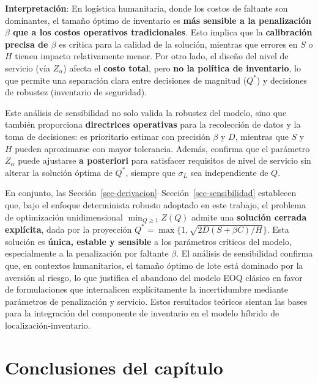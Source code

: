 \documentclass[
  spanish,
  us-letterpaper,
]{scrreprt}
\numberwithin{equation}{section}
\begin{document}
\textbf{Interpretación}: En logística humanitaria, donde los costos de
faltante son dominantes, el tamaño óptimo de inventario es \textbf{más
sensible a la penalización \(\beta\) que a los costos operativos
tradicionales}. Esto implica que la \textbf{calibración precisa de
\(\beta\)} es crítica para la calidad de la solución, mientras que
errores en \(S\) o \(H\) tienen impacto relativamente menor. Por otro
lado, el diseño del nivel de servicio (vía \(Z_\alpha\)) afecta el
\textbf{costo total}, pero \textbf{no la política de inventario}, lo que
permite una separación clara entre decisiones de magnitud (\(Q^*\)) y
decisiones de robustez (inventario de seguridad).

Este análisis de sensibilidad no solo valida la robustez del modelo,
sino que también proporciona \textbf{directrices operativas} para la
recolección de datos y la toma de decisiones: es prioritario estimar con
precisión \(\beta\) y \(D\), mientras que \(S\) y \(H\) pueden
aproximarse con mayor tolerancia. Además, confirma que el parámetro
\(Z_\alpha\) puede ajustarse \textbf{a posteriori} para satisfacer
requisitos de nivel de servicio sin alterar la solución óptima de
\(Q^*\), siempre que \(\sigma_L\) sea independiente de \(Q\).

En conjunto, las
Sección~\ref{sec-derivacion}--Sección~\ref{sec-sensibilidad} establecen
que, bajo el enfoque determinista robusto adoptado en este trabajo, el
problema de optimización unidimensional \(\min_{Q \geq 1} Z(Q)\) admite
una \textbf{solución cerrada explícita}, dada por la proyección
\(Q^* = \max\{1, \sqrt{2D(S + \beta C)/H}\}\). Esta solución es
\textbf{única, estable y sensible} a los parámetros críticos del modelo,
especialmente a la penalización por faltante \(\beta\). El análisis de
sensibilidad confirma que, en contextos humanitarios, el tamaño óptimo
de lote está dominado por la aversión al riesgo, lo que justifica el
abandono del modelo EOQ clásico en favor de formulaciones que
internalicen explícitamente la incertidumbre mediante parámetros de
penalización y servicio. Estos resultados teóricos sientan las bases
para la integración del componente de inventario en el modelo híbrido de
localización-inventario.

\section{Conclusiones del capítulo}\label{conclusiones-del-capuxedtulo}
\end{document}
